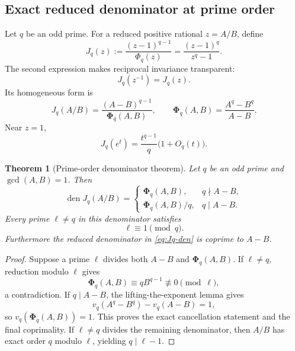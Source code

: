 \documentclass[11pt]{article}
\newtheorem{theorem}{Theorem}[section]
\theoremstyle{definition}
\theoremstyle{remark}
\newcommand{\den}{\operatorname{den}}
\newcommand{\PhiHom}{\boldsymbol{\Phi}}
\begin{document}
\subsection{Exact reduced denominator at prime order}

Let $q$ be an odd prime.  For a reduced positive rational $z=A/B$, define
\begin{equation}\label{eq:Jq-def}
 J_q(z)
 :=\frac{(z-1)^{q-1}}{\Phi_q(z)}
 =\frac{(z-1)^q}{z^q-1}.
\end{equation}
The second expression makes reciprocal invariance transparent:
\begin{equation}\label{eq:Jq-reciprocal}
 J_q(z^{-1})=J_q(z).
\end{equation}
Its homogeneous form is
\begin{equation}\label{eq:Jq-hom}
 J_q(A/B)=\frac{(A-B)^{q-1}}{\PhiHom_q(A,B)},
 \qquad
 \PhiHom_q(A,B)=\frac{A^q-B^q}{A-B}.
\end{equation}
Near $z=1$,
\begin{equation}\label{eq:Jq-local}
 J_q(e^t)=\frac{t^{q-1}}q\bigl(1+O_q(t)\bigr).
\end{equation}

\begin{theorem}[Prime-order denominator theorem]\label{thm:prime-order-den}
Let $q$ be an odd prime and $\gcd(A,B)=1$.  Then
\begin{equation}\label{eq:Jq-den}
 \den J_q(A/B)=
 \begin{cases}
 \PhiHom_q(A,B),&q\nmid A-B,\\
 \PhiHom_q(A,B)/q,&q\mid A-B.
 \end{cases}
\end{equation}
Every prime $\ell\ne q$ in this denominator satisfies
\begin{equation}\label{eq:ell-one-mod-q}
 \ell\equiv1\pmod q.
\end{equation}
Furthermore the reduced denominator in \eqref{eq:Jq-den} is coprime to $A-B$.
\end{theorem}

\begin{proof}
Suppose a prime $\ell$ divides both $A-B$ and $\PhiHom_q(A,B)$.  If $\ell\ne q$, reduction modulo $\ell$ gives
\[
 \PhiHom_q(A,B)\equiv qB^{q-1}\not\equiv0\pmod\ell,
\]
a contradiction.  If $q\mid A-B$, the lifting-the-exponent lemma gives
\[
 v_q(A^q-B^q)-v_q(A-B)=1,
\]
so $v_q(\PhiHom_q(A,B))=1$.  This proves the exact cancellation statement and the final coprimality.  If $\ell\ne q$ divides the remaining denominator, then $A/B$ has exact order $q$ modulo $\ell$, yielding $q\mid\ell-1$.
\end{proof}
\end{document}

